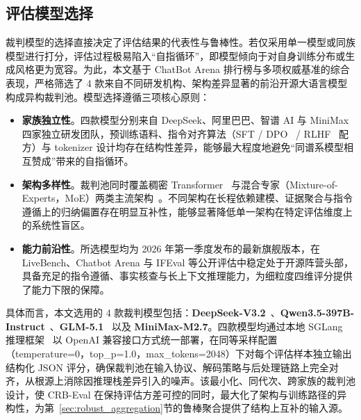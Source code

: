 \subsection{评估模型选择}



裁判模型的选择直接决定了评估结果的代表性与鲁棒性。若仅采用单一模型或同族模型进行打分，评估过程极易陷入“自指循环”，即模型倾向于对自身训练分布或生成风格更为宽容。为此，本文基于 ChatBot Arena 排行榜与多项权威基准的综合表现，严格筛选了 4 款来自不同研发机构、架构差异显著的前沿开源大语言模型构成异构裁判池。模型选择遵循三项核心原则：



\begin{itemize}
    \item \textbf{家族独立性}。四款模型分别来自 DeepSeek、阿里巴巴、智谱 AI 与 MiniMax 四家独立研发团队，预训练语料、指令对齐算法（SFT / DPO~\citep{rafailov2023direct} / RLHF~\citep{ouyang2022training} 配方）与 tokenizer 设计均存在结构性差异，能够最大程度地避免“同谱系模型相互赞成”带来的自指循环。
    \item \textbf{架构多样性}。裁判池同时覆盖稠密 Transformer~\citep{vaswani2017attention} 与混合专家（Mixture-of-Experts，MoE）两类主流架构~\citep{shazeer2017outrageously}。不同架构在长程依赖建模、证据聚合与指令遵循上的归纳偏置存在明显互补性，能够显著降低单一架构在特定评估维度上的系统性盲区。
    \item \textbf{能力前沿性}。所选模型均为 2026 年第一季度发布的最新旗舰版本，在 LiveBench、Chatbot Arena 与 IFEval 等公开评估中稳定处于开源阵营头部，具备充足的指令遵循、事实核查与长上下文推理能力，为细粒度四维评分提供了能力下限的保障。
\end{itemize}



具体而言，本文选用的 4 款裁判模型包括：\textbf{DeepSeek-V3.2}~\citep{deepseekai2024deepseekv3}、\textbf{Qwen3.5-397B-Instruct}~\citep{qwen2025qwen25technicalreport}、\textbf{GLM-5.1}~\citep{glm2024chatglmfamilylargelanguage} 以及 \textbf{MiniMax-M2.7}。四款模型均通过本地 SGLang 推理框架~\citep{zheng2024sglangefficientexecutionstructured} 以 OpenAI 兼容接口方式统一部署，在同等采样配置（temperature=0，top\_p=1.0，max\_tokens=2048）下对每个评估样本独立输出结构化 JSON 评分，确保裁判池在输入协议、解码策略与后处理链路上完全对齐，从根源上消除因推理栈差异引入的噪声。该最小化、同代次、跨家族的裁判池设计，使 CRB-Eval 在保持评估方差可控的同时，最大化了架构与训练路径的异构性，为第~\ref{sec:robust_aggregation}节的鲁棒聚合提供了结构上互补的输入源。

